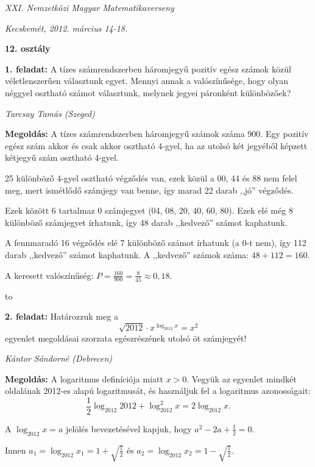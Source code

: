 \documentclass[a4paper,10pt]{article}
\newcommand{\ki}[2]{\hfill {\it #1 (#2)}\medskip}
\newcommand{\vonal}{\hbox to \hsize{\hskip2truecm\hrulefill\hskip2truecm}}
\begin{document}
\begin{center} \Large {\em XXI. Nemzetközi Magyar Matematikaverseny} \end{center}
\begin{center} \large{\em Kecskemét, 2012. március 14-18.} \end{center}
\smallskip
\begin{center} \large{\bf 12. osztály} \end{center}
\bigskip

{\bf 1. feladat: } A tízes számrendszerben háromjegyű pozitív egész számok közül véletlenszerűen választunk egyet. Mennyi annak a valószínűsége, hogy olyan néggyel osztható számot választunk, melynek jegyei páronként különbözőek?

\ki{Tarcsay Tamás}{Szeged}\medskip

{\bf Megoldás: } A tízes számrendszerben háromjegyű számok száma 900.
Egy pozitív egész szám akkor és csak akkor osztható 4-gyel, ha az utolsó két jegyéből képzett
kétjegyű szám osztható 4-gyel.

25 különböző 4-gyel osztható végződés van, ezek közül a 00, 44 és 88 nem felel meg, mert
ismétlődő számjegy van benne, így marad 22 darab ,,jó'' végződés.

Ezek között 6 tartalmaz 0 számjegyet (04, 08, 20, 40, 60, 80). Ezek elé még 8 különböző
számjegyet írhatunk, így 48 darab ,,kedvező'' számot kaphatunk.

A fennmaradó 16 végződés elé 7 különböző számot írhatunk (a 0-t nem), így 112 darab
,,kedvező'' számot kaphatunk.
A ,,kedvező'' számok száma: $48 + 112 = 160$.

A keresett valószínűség: $\displaystyle{P=
\frac{160}{900}=\frac{8}{45}\approx 0{,}18}$.

\medskip

\vonal

{\bf 2. feladat: } Határozzuk meg a
$$ \sqrt{2012}\cdot x^{\log_{2012}x}=x^2$$
egyenlet megoldásai szorzata egészrészének utolsó öt számjegyét!

\ki{Kántor Sándorné}{Debrecen}\medskip

{\bf Megoldás: } A logaritmus definíciója miatt $x > 0$. Vegyük az egyenlet mindkét oldalának 2012-es alapú logaritmusát, és használjuk fel a logaritmus azonosságait:
$$
\frac{1}{2}\log_{2012} 2012 + \log^2_{2012} x = 2 \log_{2012} x.
$$

A $\log_{2012} x = a$ jelölés bevezetésével kapjuk, hogy 
$a^2-2a+\frac{1}{2}=0$. 

Innen $a_1= \log_{2012} x_1 = 1+\sqrt{\frac{1}{2}}$
és 
$a_2= \log_{2012} x_2 = 1-\sqrt{\frac{1}{2}}$.
\end{document}
